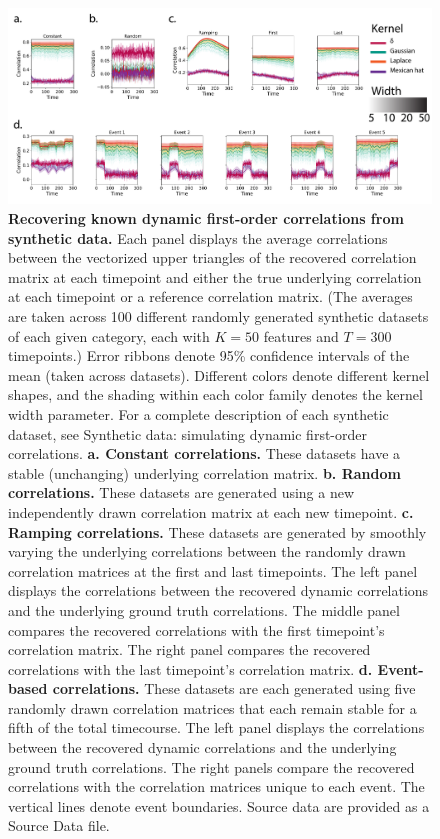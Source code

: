 \documentclass[english]{article}
\begin{document}
\begin{figure}[tp]
  \centering
  \includegraphics[width=\textwidth]{figs/synthetic_data}
  \caption{\textbf{Recovering known dynamic first-order correlations
       from synthetic data.} Each panel displays the average
    correlations between the vectorized upper triangles of the
    recovered correlation matrix at each timepoint and either the true
    underlying correlation at each timepoint or a reference
    correlation matrix.  (The averages are taken across 100 different
    randomly generated synthetic datasets of each given category, each
    with $K = 50$ features and $T = 300$ timepoints.)
    Error ribbons denote 95\% confidence intervals of the mean (taken across
    datasets). Different colors denote different kernel shapes, and
    the shading within each color family denotes the kernel width
    parameter.  For a complete description of each synthetic dataset,
    see Synthetic data: simulating dynamic first-order
      correlations. \textbf{a. Constant correlations.}  These
    datasets have a stable (unchanging) underlying correlation matrix.
  \textbf{b. Random correlations.}  These datasets are generated
    using a new independently drawn correlation matrix at each new
    timepoint. \textbf{c. Ramping correlations.} These datasets are
    generated by smoothly varying the underlying correlations between
    the randomly drawn correlation matrices at the first and last
    timepoints.  The left panel displays the correlations between the
    recovered dynamic correlations and the underlying ground truth
    correlations.  The middle panel compares the recovered
    correlations with the first timepoint's correlation
    matrix.  The right panel compares the recovered correlations with
    the last timepoint's correlation matrix.
  \textbf{d. Event-based correlations.} These datasets are each
    generated using five randomly drawn correlation matrices that each
    remain stable for a fifth of the total timecourse.  The left panel
    displays the correlations between the recovered dynamic
    correlations and the underlying ground truth correlations.  The
    right panels compare the recovered correlations with the
    correlation matrices unique to each event.  The vertical lines
    denote event boundaries. Source data are provided as a Source Data file.}
  \label{fig:synthetic}
\end{figure}
\end{document}
